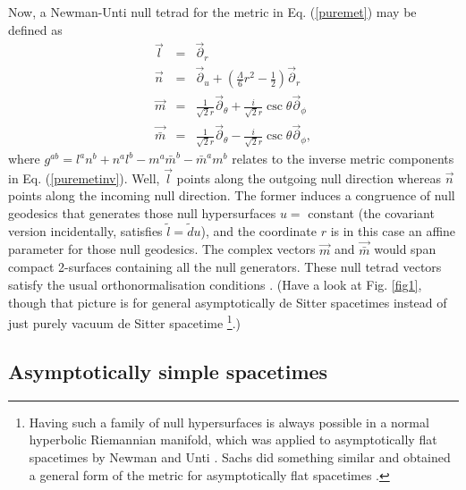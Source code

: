 \documentclass[aps,pre,preprint,superscriptaddress,showpacs,showkeys]{revtex4-1}
\begin{document}
Now, a Newman-Unti null tetrad for the metric in Eq. (\ref{puremet}) may be defined as
\begin{eqnarray}
\vec{l}&=&\vec{\partial}_r\label{NUpure1}\\
\vec{n}&=&\vec{\partial}_u+\left(\frac{\Lambda}{6}r^2-\frac{1}{2}\right)\vec{\partial}_r\\
\vec{m}&=&\frac{1}{\sqrt{2}r}\vec{\partial}_\theta+\frac{i}{\sqrt{2}r}\csc{\theta}\vec{\partial}_\phi\\
\vec{\bar{m}}&=&\frac{1}{\sqrt{2}r}\vec{\partial}_\theta-\frac{i}{\sqrt{2}r}\csc{\theta}\vec{\partial}_\phi,\label{NUpure2}
\end{eqnarray}
where $g^{ab}=l^an^b+n^al^b-m^a\bar{m}^b-\bar{m}^am^b$ relates to the inverse metric components in Eq. (\ref{puremetinv}). Well, $\vec{l}$ points along the outgoing null direction whereas $\vec{n}$ points along the incoming null direction. The former induces a congruence of null geodesics that generates those null hypersurfaces $u=$ constant (the covariant version incidentally, satisfies $\tilde{l}=\tilde{d}u$), and the coordinate $r$ is in this case an affine parameter for those null geodesics. The complex vectors $\vec{m}$ and $\vec{\bar{m}}$ would span compact 2-surfaces containing all the null generators. These null tetrad vectors satisfy the usual orthonormalisation conditions \cite{newpen62}. (Have a look at Fig. \ref{fig1}, though that picture is for general asymptotically de Sitter spacetimes instead of just purely vacuum de Sitter spacetime \footnote{Having such a family of null hypersurfaces is always possible in a normal hyperbolic Riemannian manifold, which was applied to asymptotically flat spacetimes by Newman and Unti \cite{newunti62}. Sachs did something similar and obtained a general form of the metric for asymptotically flat spacetimes \cite{Sachs62}.}.)

\subsection{Asymptotically simple spacetimes}\label{Section2B}
\end{document}

